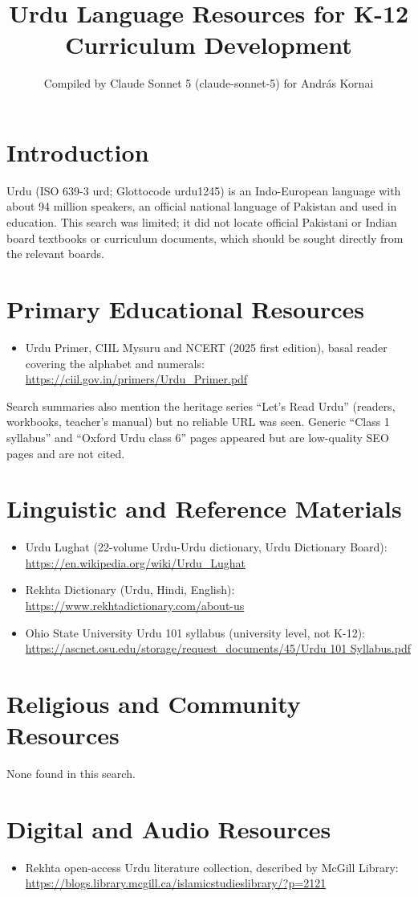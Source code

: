 \documentclass[12pt]{article}
\title{Urdu Language Resources for K-12 Curriculum Development}
\author{Compiled by Claude Sonnet 5 (claude-sonnet-5) for Andr\'as Kornai}
\date{}
\begin{document}
\maketitle
\section{Introduction}
Urdu (ISO 639-3 urd; Glottocode urdu1245) is an Indo-European language with about 94 million speakers, an official national language of Pakistan and used in education. This search was limited; it did not locate official Pakistani or Indian board textbooks or curriculum documents, which should be sought directly from the relevant boards.
\section{Primary Educational Resources}
\begin{itemize}
\item Urdu Primer, CIIL Mysuru and NCERT (2025 first edition), basal reader covering the alphabet and numerals: \url{https://ciil.gov.in/primers/Urdu_Primer.pdf}
\end{itemize}
Search summaries also mention the heritage series ``Let's Read Urdu'' (readers, workbooks, teacher's manual) but no reliable URL was seen. Generic ``Class 1 syllabus'' and ``Oxford Urdu class 6'' pages appeared but are low-quality SEO pages and are not cited.
\section{Linguistic and Reference Materials}
\begin{itemize}
\item Urdu Lughat (22-volume Urdu-Urdu dictionary, Urdu Dictionary Board): \url{https://en.wikipedia.org/wiki/Urdu_Lughat}
\item Rekhta Dictionary (Urdu, Hindi, English): \url{https://www.rekhtadictionary.com/about-us}
\item Ohio State University Urdu 101 syllabus (university level, not K-12): \url{https://ascnet.osu.edu/storage/request_documents/45/Urdu 101 Syllabus.pdf}
\end{itemize}
\section{Religious and Community Resources}
None found in this search.
\section{Digital and Audio Resources}
\begin{itemize}
\item Rekhta open-access Urdu literature collection, described by McGill Library: \url{https://blogs.library.mcgill.ca/islamicstudieslibrary/?p=2121}
\end{itemize}
\end{document}
